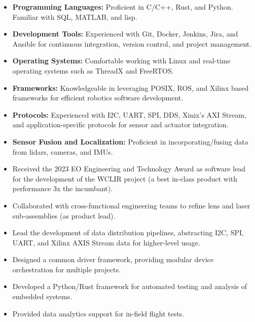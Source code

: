 \documentclass[a4paper,ragged2e,withhyper]{altacv}
\begin{document}
{
\label{sec:orgdad1287}
\begin{itemize}
\item \textbf{Programming Languages:} Proficient in C/C++, Rust, and Python. Familiar with SQL, MATLAB, and lisp.
\item \textbf{Development Tools:} Experienced with Git, Docker, Jenkins, Jira, and Ansible for continuous integration, version control, and project management.
\item \textbf{Operating Systems:} Comfortable working with Linux and real-time operating systems such as ThreadX and FreeRTOS.
\item \textbf{Frameworks:} Knowledgeable in leveraging POSIX, ROS, and Xilinx based frameworks for efficient robotics software development.
\item \textbf{Protocols:} Experienced with I2C, UART, SPI, DDS, Xinix's AXI Stream, and application-specific protocols for sensor and actuator integration.
\item \textbf{Sensor Fusion and Localization:} Proficient in incorporating/fusing data from lidars, cameras, and IMUs.
\end{itemize}
}
\label{sec:org7b8293c}


\begin{itemize}
\item Received the 2023 EO Engineering and Technology Award as software lead for the development of the WCLIR project (a best in-class product with performance 3x the incumbant).
\item Collaborated with cross-functional engineering teams to refine lens and laser sub-assemblies (as product lead).
\item Lead the development of data distribution pipelines, abstracting I2C, SPI, UART, and Xilinx AXIS Stream data for higher-level usage.
\item Designed a common driver framework, providing modular device orchestration for multiple projects.
\item Developed a Python/Rust framework for automated testing and analysis of embedded systems.
\item Provided data analytics support for in-field flight tests.
\end{itemize}

\divider
\end{document}
